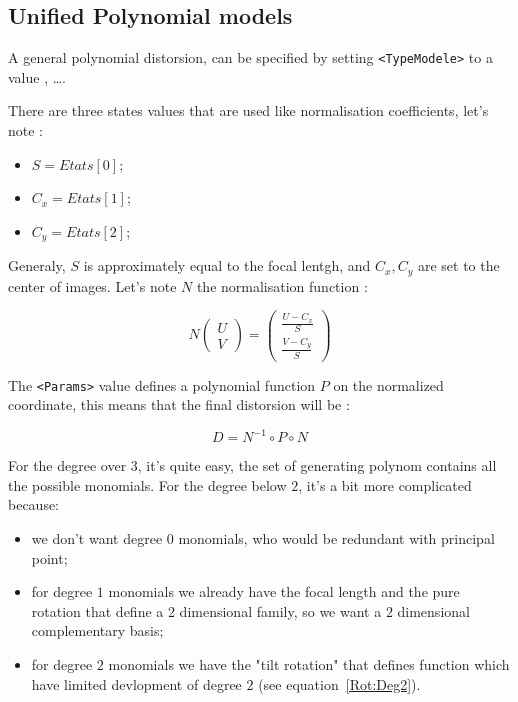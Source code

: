 
\subsection{Unified Polynomial models}

A general polynomial distorsion, can be specified by setting {\tt <TypeModele>} to a value
{\tt <eModelePolyDeg2>}, {\tt <eModelePolyDeg3>} \dots  {\tt <eModelePolyDeg7>}.

There are three states values that are used like normalisation coefficients,
let's note :

\begin{itemize}
 \item  $S = Etats[0] $;
 \item  $C_x = Etats[1] $;
 \item  $C_y = Etats[2] $;
\end{itemize}

Generaly, $S$ is approximately equal to the focal lentgh, and $C_x,C_y$ are
set to the center of images. Let's note $N$ the normalisation function :

\begin{equation}
   N \begin{pmatrix} U \\ V \end{pmatrix}
   = \begin{pmatrix} \frac{U-C_x}{S} \\  \frac{V-C_y}{S} \end{pmatrix}
\end{equation}


The {\tt <Params>} value defines a polynomial function $P$ on the normalized
coordinate, this means that the final distorsion will be :


\begin{equation}
    D = N^{-1} \circ P \circ N
\end{equation}

For the degree over $3$, it's quite easy, the set of generating polynom contains
all the possible monomials. For the degree below $2$, it's a bit more complicated
because:

\begin{itemize}
    \item  we don't want degree $0$ monomials, who would be redundant with principal point;
    \item  for degree $1$ monomials we already have the focal length and the pure rotation
           that define a 2 dimensional family, so we want a $2$ dimensional complementary
           basis;
    \item  for degree $2$ monomials we have the "tilt rotation" that defines function which
           have limited devlopment of degree $2$ (see equation~\ref{Rot:Deg2}).
\end{itemize}



